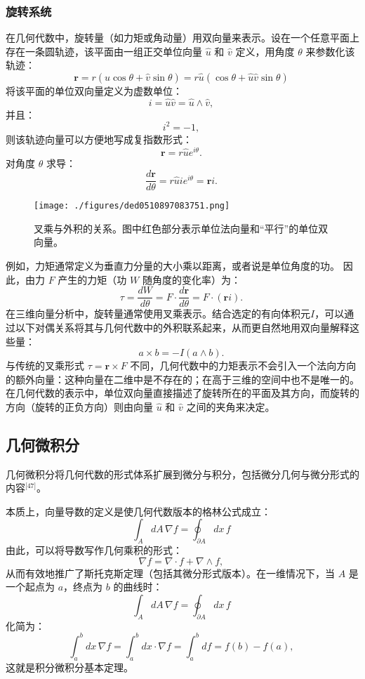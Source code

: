 \subsubsection{旋转系统}
在几何代数中，旋转量（如力矩或角动量）用双向量来表示。设在一个任意平面上存在一条圆轨迹，该平面由一组正交单位向量 $\widehat{u}$ 和 $\widehat{v}$ 定义，用角度 $\theta$ 来参数化该轨迹：
$$
\mathbf{r} = r (\widehat{u} \cos\theta + \widehat{v} \sin\theta) 
           = r \widehat{u} (\cos\theta + \widehat{u} \widehat{v} \sin\theta)~
$$
将该平面的单位双向量定义为虚数单位：
$$
i = \widehat{u} \widehat{v} = \widehat{u} \wedge \widehat{v},~
$$
并且：
$$
i^2 = -1,~
$$
则该轨迹向量可以方便地写成复指数形式：
$$
\mathbf{r} = r \widehat{u} e^{i\theta}.~
$$
对角度 $\theta$ 求导：
$$
\frac{d\mathbf{r}}{d\theta} = r \widehat{u} i e^{i\theta} = \mathbf{r} i.~
$$
\begin{figure}[ht]
\centering
\texttt{[image: ./figures/ded0510897083751.png]}
\caption{叉乘与外积的关系。图中红色部分表示单位法向量和“平行”的单位双向量。} \label{fig_jiheds_10}
\end{figure}
例如，力矩通常定义为垂直力分量的大小乘以距离，或者说是单位角度的功。
因此，由力 $F$ 产生的力矩（功 $W$ 随角度的变化率）为：
$$
\tau = \frac{dW}{d\theta} = F \cdot \frac{d\mathbf{r}}{d\theta} = F \cdot (\mathbf{r} i).~
$$
在三维向量分析中，旋转量通常使用叉乘表示。结合选定的有向体积元$I$，可以通过以下对偶关系将其与几何代数中的外积联系起来，从而更自然地用双向量解释这些量：
$$
a \times b = -I (a \wedge b).~
$$
与传统的叉乘形式 $\tau = \mathbf{r} \times F$ 不同，几何代数中的力矩表示不会引入一个法向方向的额外向量：这种向量在二维中是不存在的；在高于三维的空间中也不是唯一的。在几何代数的表示中，单位双向量直接描述了旋转所在的平面及其方向，而旋转的方向（旋转的正负方向）则由向量 $\widehat{u}$ 和 $\widehat{v}$ 之间的夹角来决定。
\subsection{几何微积分}
几何微积分将几何代数的形式体系扩展到微分与积分，包括微分几何与微分形式的内容\(^\text{[47]}\)。

本质上，向量导数的定义是使几何代数版本的格林公式成立：
$$
\int_{A} dA \, \nabla f = \oint_{\partial A} dx \, f~
$$
由此，可以将导数写作几何乘积的形式：
$$
\nabla f = \nabla \cdot f + \nabla \wedge f,~
$$
从而有效地推广了斯托克斯定理（包括其微分形式版本）。在一维情况下，当 $A$ 是一个起点为 $a$，终点为 $b$ 的曲线时：
$$
\int_{A} dA \, \nabla f = \oint_{\partial A} dx \, f~
$$
化简为：
$$
\int_{a}^{b} dx \, \nabla f
= \int_{a}^{b} dx \cdot \nabla f
= \int_{a}^{b} df
= f(b) - f(a),~
$$
这就是积分微积分基本定理。

